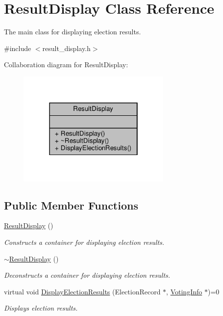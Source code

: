 \hypertarget{classResultDisplay}{}\section{Result\+Display Class Reference}
\label{classResultDisplay}


The main class for displaying election results.  




{\ttfamily \#include $<$result\+\_\+display.\+h$>$}



Collaboration diagram for Result\+Display\+:
\nopagebreak
\begin{figure}[H]
\begin{center}
\leavevmode
\includegraphics[width=214pt]{classResultDisplay__coll__graph}
\end{center}
\end{figure}
\subsection*{Public Member Functions}
\begin{DoxyCompactItemize}
\item 
\mbox{\label{classResultDisplay_ab2395a9e2f5723c8a737469bef03a2b5}} 
\hyperlink{classResultDisplay_ab2395a9e2f5723c8a737469bef03a2b5}{Result\+Display} ()
\begin{DoxyCompactList}\small\item\em Constructs a container for displaying election results. \end{DoxyCompactList}\item 
\mbox{\label{classResultDisplay_a763c9837857c1dd00d06aa2fc6d357fb}} 
\hyperlink{classResultDisplay_a763c9837857c1dd00d06aa2fc6d357fb}{$\sim$\+Result\+Display} ()
\begin{DoxyCompactList}\small\item\em Deconstructs a container for displaying election results. \end{DoxyCompactList}\item 
virtual void \hyperlink{classResultDisplay_aa5c34c71893f44bf148983c0ddf35627}{Display\+Election\+Results} (Election\+Record $\ast$, \hyperlink{classVotingInfo}{Voting\+Info} $\ast$)=0
\begin{DoxyCompactList}\small\item\em Displays election results. \end{DoxyCompactList}\end{DoxyCompactItemize}


